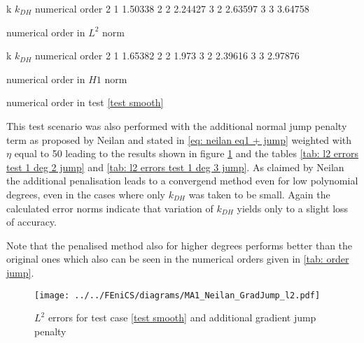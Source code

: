 \begin{table}[H]
\begin{subtable}[b]{0.45\textwidth}
\centering
	\pgfplotstabletypeset
	{
		k $k_{DH}$ {numerical order}
		2 1  1.50338
		2 2  2.24427
		3 2 2.63597
		3 3 3.64758
	}
	\caption{numerical order in $L^2$ norm}
\end{subtable}
\begin{subtable}[b]{0.45\textwidth}
	\pgfplotstabletypeset
	{
		k $k_{DH}$ {numerical order}
		2 1  1.65382 
		2 2  1.973
		3 2 2.39616
		3 3 2.97876
	}
	\caption{numerical order in $H1$ norm}
	\end{subtable}
\caption{numerical order in test \ref{test smooth}}
\label{tab: order}
\end{table}

This test scenario was also performed with the additional normal jump penalty term as proposed by Neilan and stated in \eqref{eq: neilan eq1 + jump} weighted with $\eta$ equal to 50 leading to the results shown in figure \ref{fig: l2 errors test 1 jump} and the tables \ref{tab: l2 errors test 1 deg 2 jump} and \ref{tab: l2 errors test 1 deg 3 jump}. As claimed by Neilan the additional penalisation leads to a convergend method even for low polynomial degrees, even in the cases where only $k_{DH}$ was taken to be small.
Again the calculated error norms indicate that variation of $k_{DH}$ yields only to a slight loss of accuracy. 

Note that the penalised method also for higher degrees performs better than the original ones which also can be seen in the numerical orders given in \ref{tab: order jump}.

\begin{figure}[h!]
\centering
	\texttt{[image: ../../FEniCS/diagrams/MA1\_Neilan\_GradJump\_l2.pdf]}
	\caption{$L^2$ errors for test case \ref{test smooth} and additional gradient jump penalty}
	\label{fig: l2 errors test 1 jump}
\end{figure}

